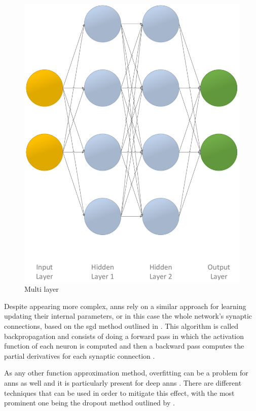 \begin{figure}[!ht]
\begin{minipage}[b]{0.45\textwidth}
		\includegraphics[width=\textwidth]{img/ann_2h}
		\caption{Multi layer }
		\label{fig:ann_2h}
	\end{minipage}
\end{figure}

Despite appearing more complex, \glspl{ann} rely on a similar approach for learning \ie updating their internal parameters, or in this case the whole network's synaptic connections, based on the \gls{sgd} method outlined in  \citep[p. 217]{Sutton2017}. This algorithm is called backpropagation and consists of doing a forward pass in which the activation function of each neuron is computed and then a backward pass computes the partial derivatives for each synaptic connection \citep[p. 218]{Sutton2017}.

As any other function approximation method, overfitting can be a problem for \glspl{ann} as well and it is particularly present for deep \glspl{ann} \citep[p. 218]{Sutton2017}. There are different techniques that can be used in order to mitigate this effect, with the most prominent one being the dropout method outlined by \citet{Srivastava2014}.

